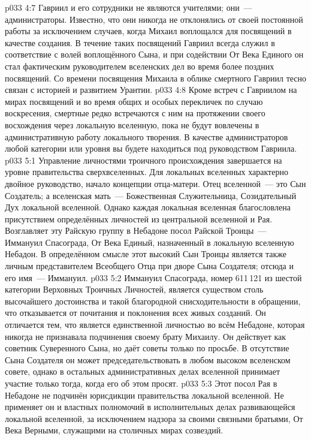 \vs p033 4:7 \pc Гавриил и его сотрудники не являются учителями; они~--- администраторы. Известно, что они никогда не отклонялись от своей постоянной работы за исключением случаев, когда Михаил воплощался для посвящений в качестве создания. В течение таких посвящений Гавриил всегда служил в соответствие с волей воплощённого Сына, и при содействии От Века Единого он стал фактическим руководителем вселенских дел во время более поздних посвящений. Со времени посвящения Михаила в облике смертного Гавриил тесно связан с историей и развитием Урантии.
\vs p033 4:8 Кроме встреч с Гавриилом на мирах посвящений и во время общих и особых перекличек по случаю воскресения, смертные редко встречаются с ним на протяжении своего восхождения через локальную вселенную, пока не будут вовлечены в административную работу локального творения. В качестве администраторов любой категории или уровня вы будете находиться под руководством Гавриила.
\vs p033 5:1 Управление личностями троичного происхождения завершается на уровне правительства сверхвселенных. Для локальных вселенных характерно двойное руководство, начало концепции отца\hyp{}матери. Отец вселенной~--- это Сын Создатель; а вселенская мать~--- Божественная Служительница, Созидательный Дух локальной вселенной. Однако каждая локальная вселенная благословлена присутствием определённых личностей из центральной вселенной и Рая. Возглавляет эту Райскую группу в Небадоне посол Райской Троицы~--- Иммануил Спасограда, От Века Единый, назначенный в локальную вселенную Небадон. В определённом смысле этот высокий Сын Троицы является также личным представителем Всеобщего Отца при дворе Сына Создателя; отсюда и его имя~--- Иммануил.
\vs p033 5:2 Иммануил Спасограда, номер 611\,121 из шестой категории Верховных Троичных Личностей, является существом столь высочайшего достоинства и такой благородной снисходительности в обращении, что отказывается от почитания и поклонения всех живых созданий. Он отличается тем, что является единственной личностью во всём Небадоне, которая никогда не признавала подчинения своему брату Михаилу. Он действует как советник Суверенного Сына, но даёт советы только по просьбе. В отсутствие Сына Создателя он может председательствовать в любом высоком вселенском совете, однако в остальных административных делах вселенной принимает участие только тогда, когда его об этом просят.
\vs p033 5:3 Этот посол Рая в Небадоне не подчинён юрисдикции правительства локальной вселенной. Не применяет он и властных полномочий в исполнительных делах развивающейся локальной вселенной, за исключением надзора за своими связными братьями, От Века Верными, служащими на столичных мирах созвездий.
